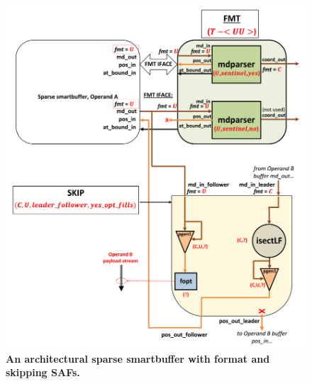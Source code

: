 \begin{figure}[H]
\includegraphics[width=\textwidth]{figures/safinference_build_11skiptopology.png}
\caption{\textbf{An architectural sparse smartbuffer with format and skipping SAFs.}}
\label{fig:safinference_build_11skiptopology}
\centering
\end{figure}

